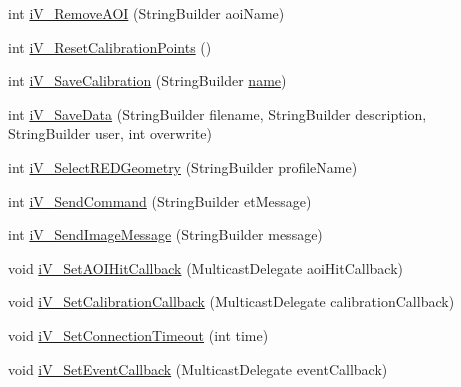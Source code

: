 \begin{DoxyCompactItemize}
\item 
int \hyperlink{class_web_analyzer_1_1_eye_tracking_1_1_eye_tracking_controller_a373f71e6004445ea0caaeb20bba4eba4}{i\+V\+\_\+\+Remove\+A\+O\+I} (String\+Builder aoi\+Name)
\item 
int \hyperlink{class_web_analyzer_1_1_eye_tracking_1_1_eye_tracking_controller_afbed91aa5c16edbd1e5d436d5abc0883}{i\+V\+\_\+\+Reset\+Calibration\+Points} ()
\item 
int \hyperlink{class_web_analyzer_1_1_eye_tracking_1_1_eye_tracking_controller_ac1c92e4cba3e833d5bb1be00ed887fbb}{i\+V\+\_\+\+Save\+Calibration} (String\+Builder \hyperlink{_u_i_2_h_t_m_l_resources_2js_2src_2create__experiment_8js_adac2bcb4f01b574cbc63fe8ee2c56bf0}{name})
\item 
int \hyperlink{class_web_analyzer_1_1_eye_tracking_1_1_eye_tracking_controller_a545d7c2443bc3394131fa4dfc1f7c26b}{i\+V\+\_\+\+Save\+Data} (String\+Builder filename, String\+Builder description, String\+Builder user, int overwrite)
\item 
int \hyperlink{class_web_analyzer_1_1_eye_tracking_1_1_eye_tracking_controller_a79fdbbd88480ab18b6e299e17e0a440e}{i\+V\+\_\+\+Select\+R\+E\+D\+Geometry} (String\+Builder profile\+Name)
\item 
int \hyperlink{class_web_analyzer_1_1_eye_tracking_1_1_eye_tracking_controller_aa59e315b1a63767b53dc2605c49f6132}{i\+V\+\_\+\+Send\+Command} (String\+Builder et\+Message)
\item 
int \hyperlink{class_web_analyzer_1_1_eye_tracking_1_1_eye_tracking_controller_aeca9fd1da5ea052b9344770778d660c0}{i\+V\+\_\+\+Send\+Image\+Message} (String\+Builder message)
\item 
void \hyperlink{class_web_analyzer_1_1_eye_tracking_1_1_eye_tracking_controller_a024bed51f65177cdf314ef9b21840509}{i\+V\+\_\+\+Set\+A\+O\+I\+Hit\+Callback} (Multicast\+Delegate aoi\+Hit\+Callback)
\item 
void \hyperlink{class_web_analyzer_1_1_eye_tracking_1_1_eye_tracking_controller_a4feb326c106556d7a7fc98a1e1b606c1}{i\+V\+\_\+\+Set\+Calibration\+Callback} (Multicast\+Delegate calibration\+Callback)
\item 
void \hyperlink{class_web_analyzer_1_1_eye_tracking_1_1_eye_tracking_controller_ab11438196fedd13ec1ceae9a024add76}{i\+V\+\_\+\+Set\+Connection\+Timeout} (int time)
\item 
void \hyperlink{class_web_analyzer_1_1_eye_tracking_1_1_eye_tracking_controller_a0583c1d3ffba6023fd798aa54506c87c}{i\+V\+\_\+\+Set\+Event\+Callback} (Multicast\+Delegate event\+Callback)

\end{DoxyCompactItemize}
